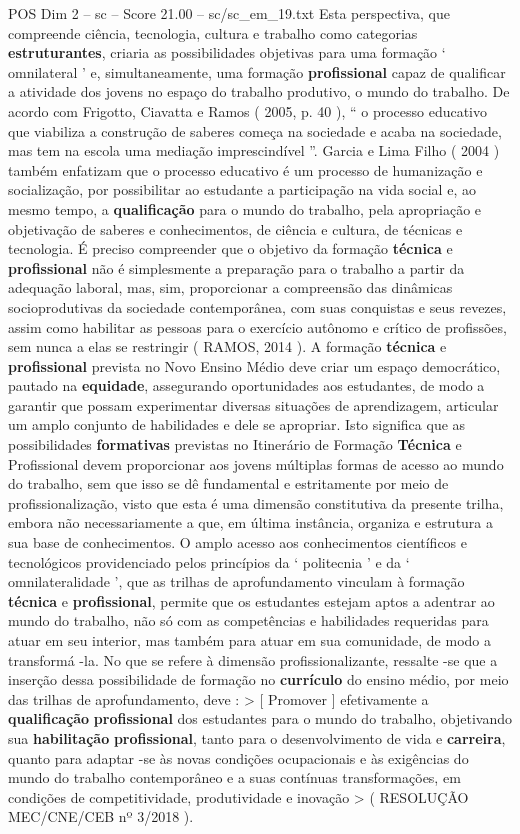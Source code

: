 \begin{textsample}{POS Dim 2 – sc – Score 21.00 – sc/sc\_em\_19.txt}
Esta perspectiva, que compreende ciência, tecnologia, cultura e trabalho como categorias \textbf{estruturantes}, criaria as possibilidades objetivas para uma formação ‘ omnilateral ’ e, simultaneamente, uma formação \textbf{profissional} capaz de qualificar a atividade dos jovens no espaço do trabalho produtivo, o mundo do trabalho.
De acordo com Frigotto, Ciavatta e Ramos ( 2005, p. 40 ), “ o processo educativo que viabiliza a construção de saberes começa na sociedade e acaba na sociedade, mas tem na escola uma mediação imprescindível ”.
Garcia e Lima Filho ( 2004 ) também enfatizam que o processo educativo é um processo de humanização e socialização, por possibilitar ao estudante a participação na vida social e, ao mesmo tempo, a \textbf{qualificação} para o mundo do trabalho, pela apropriação e objetivação de saberes e conhecimentos, de ciência e cultura, de técnicas e tecnologia.
É preciso compreender que o objetivo da formação \textbf{técnica} e \textbf{profissional} não é simplesmente a preparação para o trabalho a partir da adequação laboral, mas, sim, proporcionar a compreensão das dinâmicas socioprodutivas da sociedade contemporânea, com suas conquistas e seus revezes, assim como habilitar as pessoas para o exercício autônomo e crítico de profissões, sem nunca a elas se restringir ( RAMOS, 2014 ).
A formação \textbf{técnica} e \textbf{profissional} prevista no Novo Ensino Médio deve criar um espaço democrático, pautado na \textbf{equidade}, assegurando oportunidades aos estudantes, de modo a garantir que possam experimentar diversas situações de aprendizagem, articular um amplo conjunto de habilidades e dele se apropriar.
Isto significa que as possibilidades \textbf{formativas} previstas no Itinerário de Formação \textbf{Técnica} e Profissional devem proporcionar aos jovens múltiplas formas de acesso ao mundo do trabalho, sem que isso se dê fundamental e estritamente por meio de profissionalização, visto que esta é uma dimensão constitutiva da presente trilha, embora não necessariamente a que, em última instância, organiza e estrutura a sua base de conhecimentos.
O amplo acesso aos conhecimentos científicos e tecnológicos providenciado pelos princípios da ‘ politecnia ’ e da ‘ omnilateralidade ’, que as trilhas de aprofundamento vinculam à formação \textbf{técnica} e \textbf{profissional}, permite que os estudantes estejam aptos a adentrar ao mundo do trabalho, não só com as competências e habilidades requeridas para atuar em seu interior, mas também para atuar em sua comunidade, de modo a transformá -la.
No que se refere à dimensão profissionalizante, ressalte -se que a inserção dessa possibilidade de formação no \textbf{currículo} do ensino médio, por meio das trilhas de aprofundamento, deve : > [ Promover ] efetivamente a \textbf{qualificação} \textbf{profissional} dos estudantes para o mundo do trabalho, objetivando sua \textbf{habilitação} \textbf{profissional}, tanto para o desenvolvimento de vida e \textbf{carreira}, quanto para adaptar -se às novas condições ocupacionais e às exigências do mundo do trabalho contemporâneo e a suas contínuas transformações, em condições de competitividade, produtividade e inovação > ( RESOLUÇÃO MEC/CNE/CEB nº 3/2018 ).

\end{textsample}
